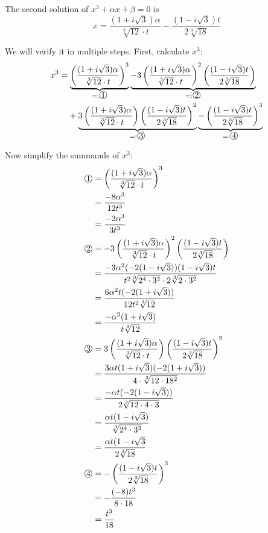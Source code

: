 The second solution of $x^3+\alpha x + \beta=0$ is
\[x = \frac{(1+i \sqrt{3})\alpha}{\sqrt[3]{12} \cdot t}
     -\frac{(1-i\sqrt{3}) t}{2\sqrt[3]{18}}\]

We will verify it in multiple steps. First, calculate $x^3$:
\begin{align}
    x^3 &= \underbrace{\left (\frac{(1+i\sqrt{3})\alpha}{\sqrt[3]{12} \cdot t} \right)^3}_{=: \raisebox{.5pt}{\textcircled{\raisebox{-.9pt} {1}}}}
           \underbrace{- 3 \left(\frac{(1+i\sqrt{3})\alpha}{\sqrt[3]{12} \cdot t} \right)^2 \left(\frac{(1-i\sqrt{3})t}{2 \sqrt[3]{18}} \right)}_{=: \raisebox{.5pt}{\textcircled{\raisebox{-.9pt} {2}}}}\\
         &\hphantom{{}=}+ \underbrace{3 \left(\frac{(1+i\sqrt{3})\alpha}{\sqrt[3]{12} \cdot t} \right) \left(\frac{(1-i\sqrt{3})t}{2 \sqrt[3]{18}}\right)^2}_{=: \raisebox{.5pt}{\textcircled{\raisebox{-.9pt} {3}}}}
           \underbrace{- \left(\frac{(1-i\sqrt{3})t}{2 \sqrt[3]{18}}\right)^3}_{=: \raisebox{.5pt}{\textcircled{\raisebox{-.9pt} {4}}}}
\end{align}

Now simplify the summands of $x^3$:
\begin{align}
    \raisebox{.5pt}{\textcircled{\raisebox{-.9pt} {1}}} &=
    \left (\frac{(1+i\sqrt{3})\alpha}{\sqrt[3]{12} \cdot t} \right)^3\\
    &= \frac{-8\alpha^3}{12 t^3}\\
    &= \frac{-2 \alpha^3}{3 t^3}\\
    \raisebox{.5pt}{\textcircled{\raisebox{-.9pt} {2}}} &=- 3 \left(\frac{(1+i\sqrt{3})\alpha}{\sqrt[3]{12} \cdot t} \right)^2 \left(\frac{(1-i\sqrt{3})t}{2 \sqrt[3]{18}} \right)\\
    &= \frac{-3\alpha^2(-2(1-i\sqrt{3}))(1-i\sqrt{3})t}{t^2 \sqrt[3]{2^4 \cdot 3^2} \cdot 2 \sqrt[3]{2 \cdot 3^2}}\\
    &= \frac{6\alpha^2 t (-2 (1+i \sqrt{3}))}{12 t^2 \sqrt[3]{12}}\\
    &= \frac{- \alpha^2 (1+i\sqrt{3})}{t\sqrt[3]{12}}\\
    \raisebox{.5pt}{\textcircled{\raisebox{-.9pt} {3}}} &= 3 \left(\frac{(1+i\sqrt{3})\alpha}{\sqrt[3]{12} \cdot t} \right) \left(\frac{(1-i\sqrt{3})t}{2 \sqrt[3]{18}}\right)^2\\
    &= \frac{3\alpha t (1+i\sqrt{3})(-2(1+i\sqrt{3}))}{4 \cdot \sqrt[3]{12 \cdot 18^2}}\\
    &= \frac{-\alpha t (-2 (1 - i \sqrt{3}))}{2 \sqrt[3]{12 \cdot 4 \cdot 3}}\\
    &= \frac{\alpha t (1-i\sqrt{3})}{\sqrt[3]{2^4 \cdot 3^2}}\\
    &= \frac{\alpha t (1-i\sqrt{3}}{2 \sqrt[3]{18}}\\
    \raisebox{.5pt}{\textcircled{\raisebox{-.9pt} {4}}} &= - \left(\frac{(1-i\sqrt{3})t}{2 \sqrt[3]{18}}\right)^3\\
    &=- \frac{(-8) t^3}{8 \cdot 18}\\
    &= \frac{t^3}{18}
\end{align}

